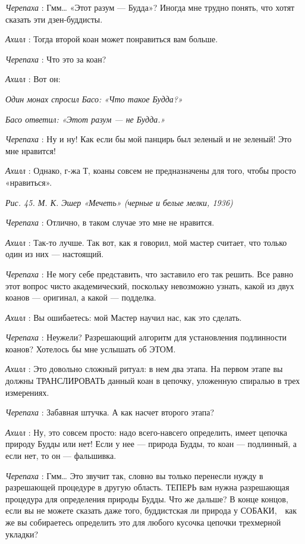 \emph{Черепаха} : Гмм\ldots{} «Этот разум --- Будда»? Иногда мне трудно понять, что хотят сказать эти дзен-буддисты.

\emph{Ахилл} : Тогда второй коан может понравиться вам больше.

\emph{Черепаха} : Что это за коан?

\emph{Ахилл} : Вот он:

\emph{Один монах спросил Басо: «Что такое Будда?»}

\emph{Басо ответил: «Этот разум --- не Будда.»}

\emph{Черепаха} : Ну и ну! Как если бы мой панцирь был зеленый и не зеленый! Это мне нравится!

\emph{Ахилл} : Однако, г-жа Т, коаны совсем не предназначены для того, чтобы просто «нравиться».

\emph{Рис. 45. М. К. Эшер «Мечеть» (черные и белые мелки, 1936)}

\emph{Черепаха} : Отлично, в таком случае это мне не нравится.

\emph{Ахилл} : Так-то лучше. Так вот, как я говорил, мой мастер считает, что только один из них --- настоящий.

\emph{Черепаха} : Не могу себе представить, что заставило его так решить. Все равно этот вопрос чисто академический, поскольку невозможно узнать, какой из двух коанов --- оригинал, а какой --- подделка.

\emph{Ахилл} : Вы ошибаетесь: мой Мастер научил нас, как это сделать.

\emph{Черепаха} : Неужели? Разрешающий алгоритм для установления подлинности коанов? Хотелось бы мне услышать об ЭТОМ.

\emph{Ахилл} : Это довольно сложный ритуал: в нем два этапа. На первом этапе вы должны ТРАНСЛИРОВАТЬ данный коан в цепочку, уложенную спиралью в трех измерениях.

\emph{Черепаха} : Забавная штучка. А как насчет второго этапа?

\emph{Ахилл} : Ну, это совсем просто: надо всего-навсего определить, имеет цепочка природу Будды или нет! Если у нее --- природа Будды, то коан --- подлинный, а если нет, то он --- фальшивка.

\emph{Черепаха} : Гмм\ldots{} Это звучит так, словно вы только перенесли нужду в разрешающей процедуре в другую область. ТЕПЕРЬ вам нужна разрешающая процедура для определения природы Будды. Что же дальше? В конце концов, если вы не можете сказать даже того, буддистская ли природа у СОБАКИ,~~как же вы собираетесь определить это для любого кусочка цепочки трехмерной укладки?


